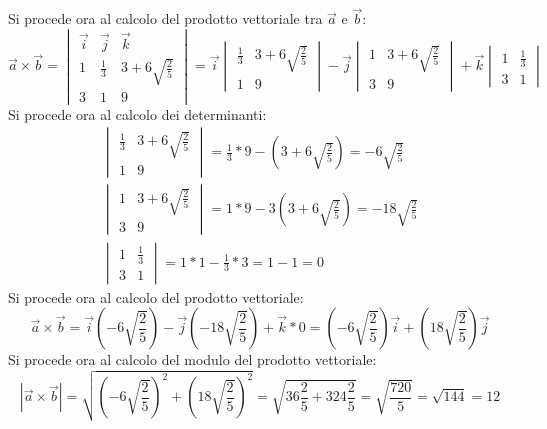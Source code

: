 \noindent Si procede ora al calcolo del prodotto vettoriale tra $\vec{a}$ e $\vec{b}$:
\begin{equation}
    \vec{a} \times \vec{b} = \begin{vmatrix}
        \vec{i} & \vec{j}     & \vec{k}               \\
        1       & \frac{1}{3} & 3+6\sqrt{\frac{2}{5}} \\
        3       & 1           & 9
    \end{vmatrix} = \vec{i} \begin{vmatrix}
        \frac{1}{3} & 3+6\sqrt{\frac{2}{5}} \\
        1           & 9
    \end{vmatrix} - \vec{j} \begin{vmatrix}
        1 & 3+6\sqrt{\frac{2}{5}} \\
        3 & 9
    \end{vmatrix} + \vec{k} \begin{vmatrix}
        1 & \frac{1}{3} \\
        3 & 1
    \end{vmatrix}
\end{equation}
Si procede ora al calcolo dei determinanti:
\begin{equation}
    \begin{split}
        \begin{vmatrix}
            \frac{1}{3} & 3+6\sqrt{\frac{2}{5}} \\
            1           & 9
        \end{vmatrix} = \frac{1}{3} * 9 - (3+6\sqrt{\frac{2}{5}}) = -6\sqrt{\frac{2}{5}} \\
        \begin{vmatrix}
            1 & 3+6\sqrt{\frac{2}{5}} \\
            3 & 9
        \end{vmatrix} = 1 * 9 - 3(3+6\sqrt{\frac{2}{5}}) = -18\sqrt{\frac{2}{5}} \\
        \begin{vmatrix}
            1 & \frac{1}{3} \\
            3 & 1
        \end{vmatrix} = 1 * 1 - \frac{1}{3} * 3 = 1 - 1 = 0
    \end{split}
\end{equation}
Si procede ora al calcolo del prodotto vettoriale:
\begin{equation}
    \vec{a} \times \vec{b} = \vec{i} (-6\sqrt{\frac{2}{5}}) - \vec{j} (-18\sqrt{\frac{2}{5}}) + \vec{k} * 0 = (-6\sqrt{\frac{2}{5}})\vec{i} + (18\sqrt{\frac{2}{5}})\vec{j}
\end{equation}
Si procede ora al calcolo del modulo del prodotto vettoriale:
\begin{equation}
    |\vec{a} \times \vec{b}| = \sqrt{(-6\sqrt{\frac{2}{5}})^2 + (18\sqrt{\frac{2}{5}})^2} = \sqrt{36\frac{2}{5} + 324\frac{2}{5}} = \sqrt{\frac{720}{5}} = \sqrt{144} = 12
\end{equation}